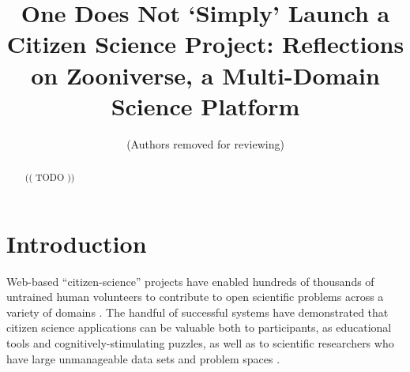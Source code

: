 \documentclass{sigchi}
\begin{document}
\title{One Does Not `Simply' Launch a Citizen Science Project: Reflections on Zooniverse, a Multi-Domain Science Platform}

 \author{ (Authors removed for reviewing) }
% 
% 
% 


\maketitle

\begin{abstract}

(( TODO ))

\end{abstract}




\section{Introduction}

Web-based ``citizen-science'' projects have enabled hundreds of thousands of untrained human volunteers to contribute to open scientific problems across a variety of domains \cite{citizen-science}.  The handful of successful systems have demonstrated that citizen science applications can be valuable both to participants, as educational tools and cognitively-stimulating puzzles\cite{citizen-science-in-curricula}, as well as to scientific researchers who have large unmanageable data sets and problem spaces \cite{fortson-2011, lintott-08, lintott-11, simpson-12, davis-11}.


\end{document}
